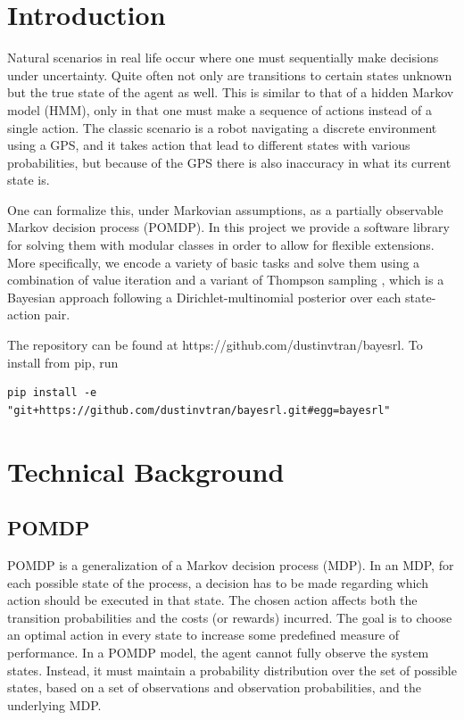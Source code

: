 \documentclass{pset}
\begin{document}

\section{Introduction}
Natural scenarios in real life occur where one must sequentially make decisions
under uncertainty. Quite often not only are transitions to certain states
unknown but the true state of the agent as well. This is similar to that of a
hidden Markov model (HMM), only in that one must make a sequence of actions
instead of a single action. The classic scenario is a robot navigating a
discrete environment using a GPS, and it takes action that lead to different
states with various probabilities, but because of the GPS there is also
inaccuracy in what its current state is.

One can formalize this, under Markovian assumptions, as a partially observable
Markov decision process (POMDP). In this project we provide a software
library for solving them with modular classes in order to allow for flexible
extensions.  More specifically, we encode a variety of basic tasks and solve
them using a combination of value iteration and a variant of Thompson sampling
\cite{strens2000bayesian}, which is a Bayesian approach
following a Dirichlet-multinomial posterior over each state-action pair.

The repository can be found at https://github.com/dustinvtran/bayesrl.
To install from pip, run
\begin{lstlisting}
pip install -e "git+https://github.com/dustinvtran/bayesrl.git#egg=bayesrl"
\end{lstlisting}

\section{Technical Background}

\subsection{POMDP}
POMDP is a generalization of a Markov decision process (MDP). In an MDP, for each possible state of
the process, a decision has to be made regarding which action should be executed in that state. The
chosen action affects both the transition probabilities and the costs (or rewards) incurred. The
goal is to choose an optimal action in every state to increase some predefined measure of
performance. In a POMDP model, the agent cannot fully observe the system states.
Instead, it must maintain a probability distribution over the set of possible states,
based on a set of observations and observation probabilities, and the underlying MDP.
\end{document}
